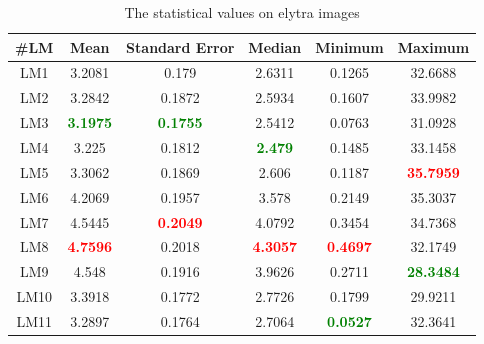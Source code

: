 \documentclass[review]{elsarticle}
\begin{document}
\begin{table}[htbp]
	\begin{tabular}{ | c | c | c | c | c | c | }
\hline
	 \textbf{\#LM} & \textbf{Mean} & \textbf{Standard Error} & \textbf{Median} & \textbf{Minimum} & \textbf{Maximum} \\ \hline
	LM1 & 3.2081 & 0.179 & 2.6311 & 0.1265 & 32.6688 \\ \hline
	LM2 & 3.2842 & 0.1872 & 2.5934 & 0.1607 & 33.9982 \\ \hline
	LM3 & \textcolor{green}{\textbf{3.1975}} & \textcolor{green}{\textbf{0.1755}} & 2.5412 & 0.0763 & 31.0928 \\ \hline
	LM4 & 3.225 & 0.1812 & \textcolor{green}{\textbf{2.479}} & 0.1485 & 33.1458 \\ \hline
	LM5 & 3.3062 & 0.1869 & 2.606 & 0.1187 & \textcolor{red}{\textbf{35.7959}} \\ \hline
	LM6 & 4.2069 & 0.1957 & 3.578 & 0.2149 & 35.3037 \\ \hline
	LM7 & 4.5445 & \textcolor{red}{\textbf{0.2049}} & 4.0792 & 0.3454 & 34.7368 \\ \hline
	LM8 & \textcolor{red}{\textbf{4.7596}} & 0.2018 & \textcolor{red}{\textbf{4.3057}} & \textcolor{red}{\textbf{0.4697}} & 32.1749 \\ \hline
	LM9 & 4.548 & 0.1916 & 3.9626 & 0.2711 & \textcolor{green}{\textbf{28.3484}} \\ \hline
	LM10 & 3.3918 & 0.1772 & 2.7726 & 0.1799 & 29.9211 \\ \hline
	LM11 & 3.2897 & 0.1764 & 2.7064 & \textcolor{green}{\textbf{0.0527}} & 32.3641 \\ \hline
\end{tabular}
\caption{The statistical values on elytra images}
\label{a3}
\end{table}
\pagebreak
\end{document}
